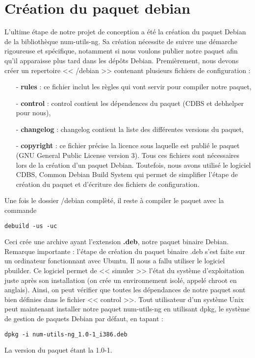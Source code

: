 \section{Cr\'eation du paquet debian}
L'ultime \'etape de notre projet de conception a \'et\'e la cr\'eation du paquet Debian de la biblioth\`eque num-utils-ng.
Sa cr\'eation n\'ecessite de suivre une d\'emarche rigoureuse et sp\'ecifique, notamment si nous voulons publier notre paquet afin
qu'il apparaisse plus tard dans les d\'ep\^ots Debian.
\newline
Premi\`erement, nous devons cr\'eer un repertoire << /debian >> contenant plusieurs fichiers de configuration :
\begin{itemize}
 \item [-] \textbf{rules} : ce fichier inclut les r\`egles qui vont servir pour compiler notre paquet,
 \item [-] \textbf{control} : control contient les d\'ependences du paquet (CDBS et debhelper pour nous),
 \item [-] \textbf{changelog} : changelog contient la liste des diff\'erentes versions du paquet, 
 \item [-] \textbf{copyright} : ce fichier pr\'ecise la licence sous laquelle est publi\'e le paquet (GNU General Public License version 3).
Tous ces fichiers sont n\'ecessaires lors  de la cr\'eation d'un paquet Debian. Toutefois, nous avons utilis\'e le logiciel 
CDBS, Common Debian Build System \citep{cdbs} qui permet de simplifier l'\'etape de cr\'eation du paquet et d'\'ecriture des fichiers de configuration.
\newline
\end{itemize}
Une fois le dossier /debian compl\`et\'e, il reste \`a compiler le paquet avec la commande
\begin{verbatim}debuild -us -uc\end{verbatim}
Ceci cr\'ee une archive ayant l'extension \textbf{.deb}, notre paquet binaire Debian.
\newline
{}
Remarque importante : l'\'etape de cr\'eation du paquet binaire .deb s'est faite sur un ordinateur fonctionnant avec Ubuntu. Il nous a fallu utiliser le logiciel pbuilder. Ce logiciel
permet de << simuler >> l'\'etat du syst\`eme d'exploitation juste apr\`es son installation (on cr\'ee un environnement isol\'e, appel\'e chroot en anglais).
Ainsi, on peut v\'erifier que toutes les d\'ependances de notre paquet sont bien d\'efinies dans le fichier << control >>.
\newline
{}
Tout utilisateur d'un syst\`eme Unix peut maintenant installer notre paquet num-utils-ng en utilisant dpkg, le syst\`eme de gestion de paquets Debian 
par d\'efaut, en tapant :
\begin{verbatim}dpkg -i num-utils-ng_1.0-1_i386.deb\end{verbatim}
La version du paquet \'etant la 1.0-1.





